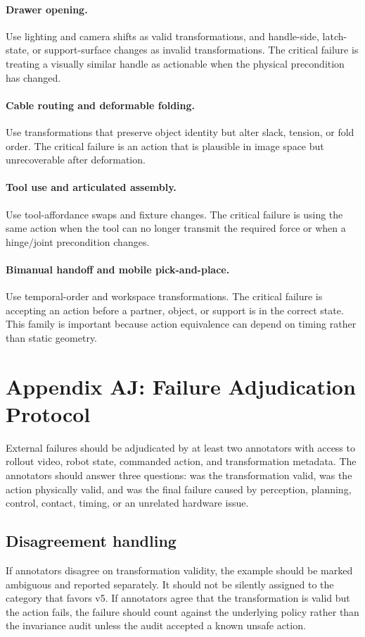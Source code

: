 \documentclass{article}
\begin{document}
\paragraph{Drawer opening.} Use lighting and camera shifts as valid transformations, and handle-side, latch-state, or support-surface changes as invalid transformations. The critical failure is treating a visually similar handle as actionable when the physical precondition has changed.

\paragraph{Cable routing and deformable folding.} Use transformations that preserve object identity but alter slack, tension, or fold order. The critical failure is an action that is plausible in image space but unrecoverable after deformation.

\paragraph{Tool use and articulated assembly.} Use tool-affordance swaps and fixture changes. The critical failure is using the same action when the tool can no longer transmit the required force or when a hinge/joint precondition changes.

\paragraph{Bimanual handoff and mobile pick-and-place.} Use temporal-order and workspace transformations. The critical failure is accepting an action before a partner, object, or support is in the correct state. This family is important because action equivalence can depend on timing rather than static geometry.


\section{Appendix AJ: Failure Adjudication Protocol}
External failures should be adjudicated by at least two annotators with access to rollout video, robot state, commanded action, and transformation metadata. The annotators should answer three questions: was the transformation valid, was the action physically valid, and was the final failure caused by perception, planning, control, contact, timing, or an unrelated hardware issue.

\subsection{Disagreement handling}
If annotators disagree on transformation validity, the example should be marked ambiguous and reported separately. It should not be silently assigned to the category that favors v5. If annotators agree that the transformation is valid but the action fails, the failure should count against the underlying policy rather than the invariance audit unless the audit accepted a known unsafe action.
\end{document}

